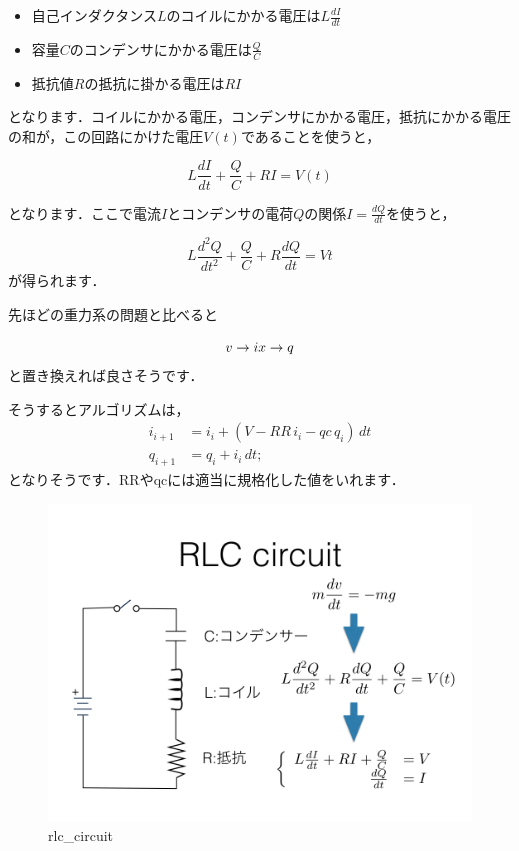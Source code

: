 \documentclass[11pt,dvipdfmx]{jsarticle}
\makeatletter
\def\maxwidth{\ifdim\Gin@nat@width>\linewidth\linewidth
    \else\Gin@nat@width\fi}
\let\Oldincludegraphics\includegraphics
\renewcommand{\includegraphics}[1]{\Oldincludegraphics[width=.8\maxwidth]{#1}}
\providecommand{\tightlist}{%
      \setlength{\itemsep}{0pt}\setlength{\parskip}{0pt}}
\makeatother
\begin{document}
\begin{itemize}
\tightlist
\item
  自己インダクタンス\(L\)のコイルにかかる電圧は\(L \frac{dI}{dt}\)
\item
  容量\(C\)のコンデンサにかかる電圧は\(\frac{Q}{C}\)
\item
  抵抗値\(R\)の抵抗に掛かる電圧は\(RI\)
\end{itemize}

となります．コイルにかかる電圧，コンデンサにかかる電圧，抵抗にかかる電圧の和が，この回路にかけた電圧\(V(t)\)であることを使うと，

\[
L \frac{dI}{dt} + \frac{Q}{C} + RI = V(t)
\]

となります．ここで電流\(I\)とコンデンサの電荷\(Q\)の関係\(I=\frac{dQ}{dt}\)を使うと，

\[
L \frac{d^2Q}{dt^2} + \frac{Q}{C} + R\frac{dQ}{dt} = V{t}
\] が得られます．

先ほどの重力系の問題と比べると

\[
v \rightarrow i \\
x \rightarrow q
\] と置き換えれば良さそうです．

そうするとアルゴリズムは， \[
\begin{aligned}
i_{i+1} & = i_i + (V - RR \, i_i -qc \, q_i) \, dt \\
q_{i+1} & = q_i + i_i \, dt;
\end{aligned}
\] となりそうです．RRやqcには適当に規格化した値をいれます．

\begin{figure}[htbp]
\centering
\includegraphics{../figs/ode.005.jpeg}
\caption{rlc\_circuit}
\end{figure}
\end{document}
